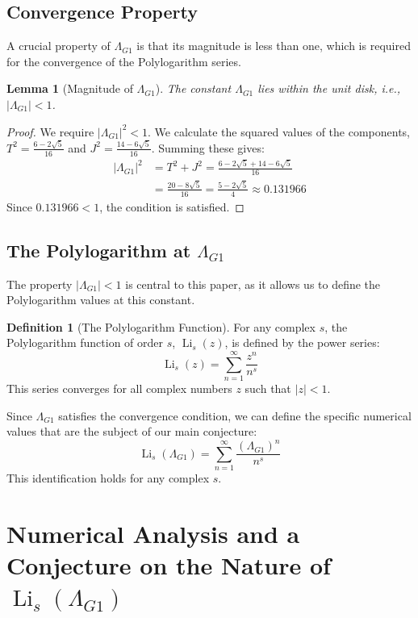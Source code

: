 \documentclass{amsart}
\theoremstyle{plain}
\newtheorem{lemma}[theorem]{Lemma}
\theoremstyle{definition}
\newtheorem{definition}[theorem]{Definition}
\theoremstyle{remark}
\DeclareMathOperator{\Li}{Li}
\newcommand{\LambdaG}{\Lambda_{G1}}
\begin{document}
\subsection{Convergence Property}
A crucial property of $\LambdaG$ is that its magnitude is less than one, which is required for the convergence of the Polylogarithm series.
\begin{lemma}[Magnitude of $\LambdaG$]
\label{lem:convergence}
The constant $\LambdaG$ lies within the unit disk, i.e., $|\LambdaG| < 1$.
\end{lemma}
\begin{proof}
We require $|\LambdaG|^2 < 1$. We calculate the squared values of the components, $T^2 = \frac{6-2\sqrt{5}}{16}$ and $J^2 = \frac{14-6\sqrt{5}}{16}$. Summing these gives:
\begin{align*}
    |\LambdaG|^2 &= T^2+J^2 = \frac{6-2\sqrt{5} + 14-6\sqrt{5}}{16} \\
                 &= \frac{20-8\sqrt{5}}{16} = \frac{5-2\sqrt{5}}{4} \approx 0.131966
\end{align*}
Since $0.131966 < 1$, the condition is satisfied.
\end{proof}

\subsection{The Polylogarithm at \texorpdfstring{$\LambdaG$}{Lambda\_G1}}
The property $|\LambdaG| < 1$ is central to this paper, as it allows us to define the Polylogarithm values at this constant.
\begin{definition}[The Polylogarithm Function]
For any complex $s$, the Polylogarithm function of order $s$, $\Li_s(z)$, is defined by the power series:
\[ \Li_s(z) = \sum_{n=1}^{\infty} \frac{z^n}{n^s} \]
This series converges for all complex numbers $z$ such that $|z|<1$.
\end{definition}

Since $\LambdaG$ satisfies the convergence condition, we can define the specific numerical values that are the subject of our main conjecture:
\[ \Li_s(\LambdaG) = \sum_{n=1}^{\infty} \frac{(\LambdaG)^{n}}{n^s} \]
This identification holds for any complex $s$.

\section{Numerical Analysis and a Conjecture on the Nature of \texorpdfstring{$\Li_s(\LambdaG)$}{Li\_s(Lambda\_G1)}}
\end{document}
